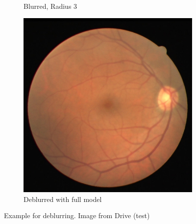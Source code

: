 \documentclass{scrartcl}
\begin{document}
\begin{figure}[htb]
\begin{subfigure}{0.33\textwidth}
    \caption{Blurred, Radius 3}
\end{subfigure}%
\begin{subfigure}{0.33\textwidth}
\centering
    \includegraphics[width=1.0\textwidth]{deblur_gan}
    \caption{Deblurred with full model}
\end{subfigure}

\caption{Example for deblurring. Image from Drive (test)~\cite{Drive}}
\label{fig:deblurring-example}
\end{figure}
\end{document}
